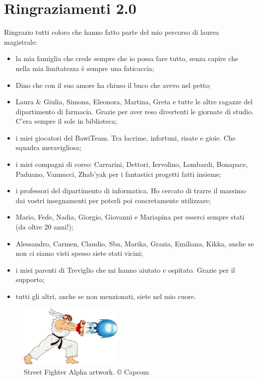 %
%
\chapter*{Ringraziamenti 2.0}

Ringrazio tutti coloro che hanno fatto parte del mio percorso di laurea magistrale:
\begin{itemize}
	\item la mia famiglia che crede sempre che io possa fare tutto, senza capire che nella mia limitatezza è sempre una faticaccia;	
	\item Dino che con il suo amore ha chiuso il buco che avevo nel petto;
	\item Laura \& Giulia, Simona, Eleonora, Martina, Greta e tutte le altre ragazze del dipartimento di farmacia. Grazie per aver reso divertenti le giornate di studio. C'era sempre il sole in biblioteca;
	\item i miei giocatori del BawiTeam. Tra lacrime, infortuni, risate e gioie. Che squadra meravigliosa;
	\item i miei compagni di corso: Carrarini, Dettori, Iervolino, Lombardi, Bonapace, Paduano, Vannucci, Zhab'yak per i fantastici progetti fatti insieme;
	\item i professori del dipartimento di informatica. Ho cercato di trarre il massimo dai vostri insegnamenti per poterli poi concretamente utilizzare;
	\item Mario, Fede, Nadia, Giorgio, Giovanni e Mariapina per esserci sempre stati (da oltre 20 anni!);
	\item Alessandro, Carmen, Claudio, Sba, Marika, Grazia, Emiliana, Kikka, anche se non ci siamo visti spesso siete stati vicini;	
	\item i miei parenti di Treviglio che mi hanno aiutato e ospitato. Grazie per il supporto;
	\item tutti gli altri, anche se non menzionati, siete nel mio cuore.
\end{itemize}

\vspace*{\fill}

\begin{figure}[H]
	\centering
	\includegraphics[width=5cm]{immagini/hadoken}
	\caption{Street Fighter Alpha artwork. © Capcom}
	\label{fig:hadoken}
\end{figure}
